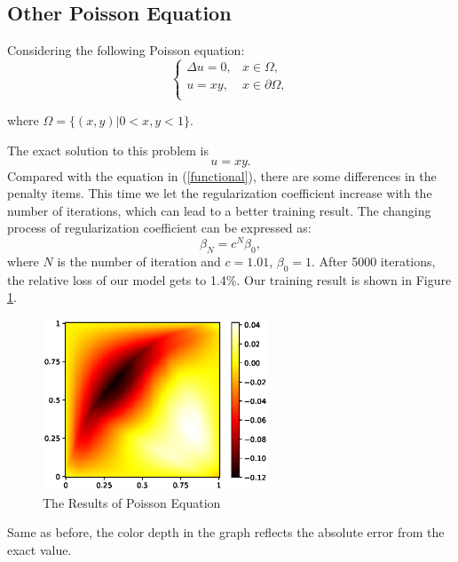 \documentclass{article}
\begin{document}
\subsection{Other Poisson Equation}
\par Considering the following Poisson equation:
\begin{equation}
	\begin{cases}
		\Delta u=0, & x\in \Omega, \\
 		u=xy, & x\in \partial \Omega, \\
 	\end{cases}
\end{equation}

where $\Omega =\{(x,y)| 0<x,y<1\}$.
\par The exact solution to this problem is 
\begin{equation}
u=xy.
\end{equation}
Compared with the equation in (\ref{functional}), there are some differences in the penalty items. This time we let the regularization coefficient increase with the number of iterations, which can lead to a better training result. The changing process of regularization coefficient can be expressed as:
\begin{equation}
\beta_{N} = c^{N}\beta_{0},
\end{equation}
where $N$ is the number of iteration and $c = 1.01$, $\beta_0=1$. After 5000 iterations, the relative loss of our model gets to 1.4\%. Our training result is shown in Figure \ref{3.2a}.
\begin{figure}[ht]
 	 \centering
 	 \includegraphics[width=0.6\textwidth]{./images/loss_yubing.eps} 
	 \caption{The Results of Poisson Equation}
	 \label{3.2a}
\end{figure}

Same as before, the color depth in the graph reflects the absolute error from the exact value.
\end{document}
